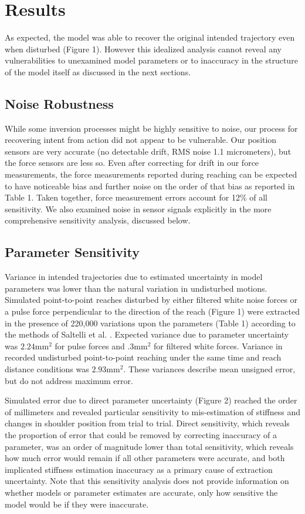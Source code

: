 \section*{Results}
As expected, the model was able to recover the original intended trajectory even when disturbed (Figure 1). However this idealized analysis cannot reveal any vulnerabilities to unexamined model parameters or to inaccuracy in the structure of the model itself as discussed in the next sections.

\subsection*{Noise Robustness}
While some inversion processes might be highly sensitive to noise, our process for recovering intent from action did not appear to be vulnerable. Our position sensors are very accurate (no detectable drift, RMS noise 1.1 micrometers), but the force sensors are less so. Even after correcting for drift in our force measurements, the force measurements reported during reaching can be expected to have noticeable bias and further noise on the order of that bias as reported in Table 1. Taken together, force measurement errors account for 12\% of all sensitivity. We also examined noise in sensor signals explicitly in the more comprehensive sensitivity analysis, discussed below.

\subsection*{Parameter Sensitivity}
Variance in intended trajectories due to estimated uncertainty in model parameters was lower than the natural variation in undisturbed motions. Simulated point-to-point reaches disturbed by either filtered white noise forces or a pulse force perpendicular to the direction of the reach (Figure 1) were extracted in the presence of 220,000 variations upon the parameters (Table 1) according to the methods of Saltelli et al. \cite{saltelli2010variance}. Expected variance due to parameter uncertainty was $2.24 \mathrm{mm}^2$ for pulse forces and $.3 \mathrm{mm}^2$ for filtered white forces. Variance in recorded undisturbed point-to-point reaching under the same time and reach distance conditions was $2.93 \mathrm{mm}^2$. These variances describe mean unsigned error, but do not address maximum error.

Simulated error due to direct parameter uncertainty (Figure 2) reached the order of millimeters and revealed particular sensitivity to mis-estimation of stiffness and changes in shoulder position from trial to trial. Direct sensitivity, which reveals the proportion of error that could be removed by correcting inaccuracy of a parameter, was an order of magnitude lower than total sensitivity, which reveals how much error would remain if all other parameters were accurate, and both implicated stiffness estimation inaccuracy as a primary cause of extraction uncertainty. Note that this sensitivity analysis does not provide information on whether models or parameter estimates are accurate, only how sensitive the model would be if they were inaccurate. 

